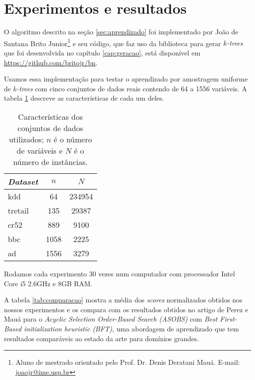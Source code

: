 \section{Experimentos e resultados}

O algoritmo descrito na seção \ref{sec:aprendizado} foi implementado por João de Santana Brito Junior\footnote{Aluno de mestrado orientado pelo Prof. Dr. Denis Deratani Mauá. E-mail: \href{mailto:joaojr@ime.usp.br}{joaojr@ime.usp.br}} e seu código, que faz uso da biblioteca para gerar \emph{$k$-trees} que foi desenvolvida no capítulo \ref{cap:geracao}, está disponível em \url{https://github.com/britojr/bn}.

Usamos essa implementação para testar o aprendizado por amostragem uniforme de \emph{$k$-trees} com cinco conjuntos de dados reais contendo de 64 a 1556 variáveis. A tabela \ref{tab:conjuntos} descreve as características de cada um deles.

\begin{table}[h]
  \centering
  \begin{tabular}{l c c} \hline
    \emph{Dataset} & $n$ & $N$ \\ \hline
    kdd & 64 & 234954 \\
    tretail & 135 & 29387 \\
    cr52 & 889 & 9100 \\
    bbc & 1058 & 2225 \\
    ad & 1556 & 3279 \\ \hline
  \end{tabular}

  \caption{Características dos conjuntos de dados utilizados; $n$ é o número de variáveis e $N$ é o número de instâncias.}
  \label{tab:conjuntos}
\end{table}

Rodamos cada experimento 30 vezes num computador com processador Intel Core i5 2.6GHz e 8GB RAM.

\vspace{1em}

A tabela \ref{tab:comparacao} mostra a média dos \emph{scores} normalizados obtidos nos nossos experimentos e os compara com os resultados obtidos no artigo de Perez e Mauá \cite{perez} para o \emph{Acyclic Selection Order-Based Search (ASOBS)} com \emph{Best First-Based initialization heuristic (BFT)}, uma abordagem de aprendizado que tem resultados comparáveis ao estado da arte para domínios grandes.

